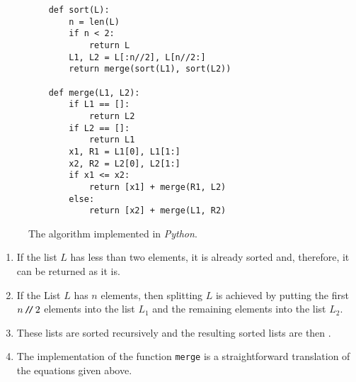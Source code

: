\begin{figure}[!ht]
  \centering
\begin{verbatim}
    def sort(L):
        n = len(L)
        if n < 2:
            return L
        L1, L2 = L[:n//2], L[n//2:]
        return merge(sort(L1), sort(L2))
    
    def merge(L1, L2):
        if L1 == []:
            return L2
        if L2 == []:
            return L1
        x1, R1 = L1[0], L1[1:]
        x2, R2 = L2[0], L2[1:]
        if x1 <= x2:
            return [x1] + merge(R1, L2)
        else:
            return [x2] + merge(L1, R2)
\end{verbatim}
\vspace*{-0.3cm}
  \caption{The  algorithm implemented in \textsl{Python}.}
  \label{fig:merge-sort.stlx}
\end{figure}
\begin{enumerate}
\item If the list $L$ has less than two elements, it is already sorted and, therefore, it
      can be returned as it is.
\item If the List $L$ has $n$ elements, then splitting $L$ is achieved by putting the first $n\mbox{\,\texttt{/}$\!$\texttt{/}\,} 2$
      elements into the list $L_1$ and the remaining elements into the list $L_2$.
\item These lists are sorted recursively and the resulting sorted lists are then .
\item The implementation of the function \texttt{merge} is a straightforward translation of the equations
      given above.
\end{enumerate}

